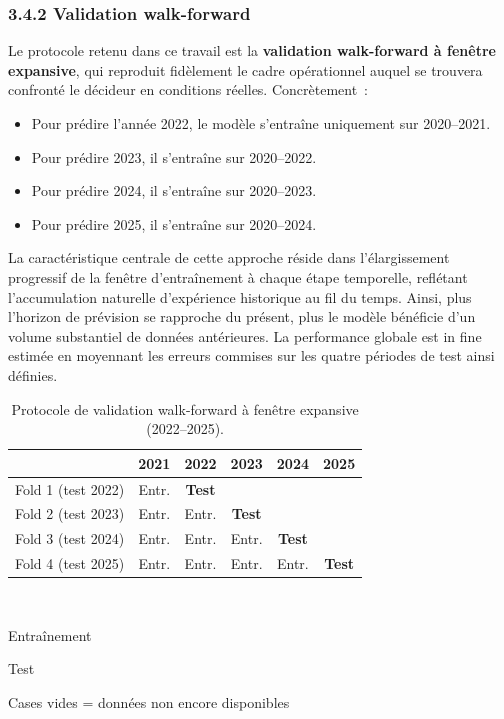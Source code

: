 \subsubsection*{3.4.2 \quad Validation walk-forward}

Le protocole retenu dans ce travail est la \textbf{validation walk-forward à fenêtre
expansive}, qui reproduit fidèlement le cadre opérationnel auquel se trouvera confronté
le décideur en conditions réelles. Concrètement~:

\begin{itemize}
    \item Pour prédire l'année 2022, le modèle s'entraîne uniquement sur 2020--2021.
    \item Pour prédire 2023, il s'entraîne sur 2020--2022.
    \item Pour prédire 2024, il s'entraîne sur 2020--2023.
    \item Pour prédire 2025, il s'entraîne sur 2020--2024.
\end{itemize}

La caractéristique centrale de cette approche réside dans l'élargissement progressif
de la fenêtre d'entraînement à chaque étape temporelle, reflétant l'accumulation
naturelle d'expérience historique au fil du temps. Ainsi, plus l'horizon de prévision
se rapproche du présent, plus le modèle bénéficie d'un volume substantiel de données
antérieures. La performance globale est in fine estimée en moyennant les erreurs commises
sur les quatre périodes de test ainsi définies.

\begin{table}[h]
\centering
\setlength{\tabcolsep}{4pt}
\caption{Protocole de validation walk-forward \`a fen\^etre expansive (2022--2025).}
\label{tab:walkforward}
\begin{tabular}{l|ccccc}
\hline
 & \textbf{2021} & \textbf{2022} & \textbf{2023} & \textbf{2024} & \textbf{2025} \\
\hline
Fold 1 (test 2022) & \cellcolor{accent!30}Entr. & \cellcolor{primary!40}\textbf{Test} & & & \\
Fold 2 (test 2023) & \cellcolor{accent!30}Entr. & \cellcolor{accent!30}Entr. & \cellcolor{primary!40}\textbf{Test} & & \\
Fold 3 (test 2024) & \cellcolor{accent!30}Entr. & \cellcolor{accent!30}Entr. & \cellcolor{accent!30}Entr. & \cellcolor{primary!40}\textbf{Test} & \\
Fold 4 (test 2025) & \cellcolor{accent!30}Entr. & \cellcolor{accent!30}Entr. & \cellcolor{accent!30}Entr. & \cellcolor{accent!30}Entr. & \cellcolor{primary!40}\textbf{Test} \\
\hline
\end{tabular}\\[4pt]
{\scriptsize \colorbox{accent!30}{\strut Entra\^inement} \quad
\colorbox{primary!40}{\strut Test} \quad Cases vides = donn\'ees non encore disponibles}
\end{table}

